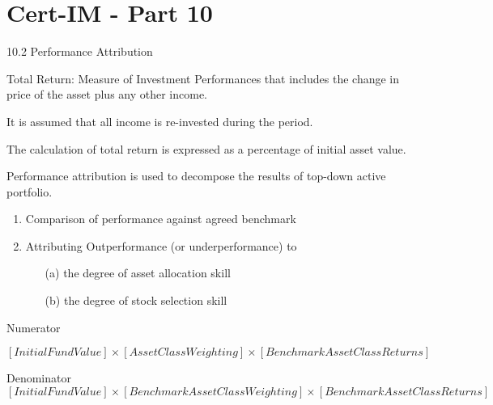 \section{Cert-IM - Part 10}

10.2 Performance Attribution

Total Return: Measure of Investment Performances that includes the change in price of the asset plus any other income.

It is assumed that all income is re-invested during the period.

The calculation of total return is expressed as a percentage of initial asset value.

Performance attribution is used to decompose the results of top-down active portfolio.

\begin{enumerate}
\item Comparison of performance against agreed benchmark
\item Attributing Outperformance (or underperformance) to
\begin{itemize}
\item[(a)] the degree of asset allocation skill
\item[(b)] the degree of stock selection skill
\end{itemize}
\end{enumerate}


Numerator

\[  
\left[ Initial Fund Value  \right] \times 
\left[ Asset Class Weighting \right] \times 
\left[ Benchmark Asset Class Returns \right]
\]

Denominator
\[  
\left[ Initial Fund Value  \right] \times 
\left[ Benchmark Asset Class Weighting \right] \times 
\left[ Benchmark Asset Class Returns \right]
\]
